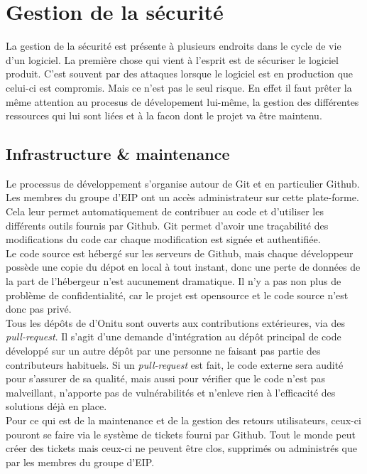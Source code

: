 \section{Gestion de la sécurité}

La gestion de la sécurité est présente à plusieurs endroits dans le cycle de vie d'un logiciel. La première chose qui vient à l'esprit est de sécuriser le logiciel produit. C'est souvent par des attaques lorsque le logiciel est en production que celui-ci est compromis. Mais ce n'est pas le seul risque. En effet il faut prêter la même attention au procesus de dévelopement lui-même, la gestion des différentes ressources qui lui sont liées et à la facon dont le projet va être maintenu.

\subsection{Infrastructure \& maintenance}

Le processus de développement s'organise autour de Git et en particulier Github. Les membres du groupe d'EIP ont un accès administrateur sur cette plate-forme. Cela leur permet automatiquement de contribuer au code et d'utiliser les différents outils fournis par Github. Git permet d'avoir une traçabilité des modifications du code car chaque modification est signée et authentifiée.\\

Le code source est hébergé sur les serveurs de Github, mais chaque développeur possède une copie du dépot en local à tout instant, donc une perte de données de la part de l'hébergeur n'est aucunement dramatique. Il n'y a pas non plus de problème de confidentialité, car le projet est opensource et le code source n'est donc pas privé.\\

Tous les dépôts de d'Onitu sont ouverts aux contributions extérieures, via des \textit{pull-request}. Il s'agit d'une demande d'intégration au dépôt principal de code développé sur un autre dépôt par une personne ne faisant pas partie des contributeurs habituels. Si un \textit{pull-request} est fait, le code externe sera audité pour s'assurer de sa qualité, mais aussi pour vérifier que le code n'est pas malveillant, n'apporte pas de vulnérabilités et n'enleve rien à l'efficacité des solutions déjà en place.\\

Pour ce qui est de la maintenance et de la gestion des retours utilisateurs, ceux-ci pouront se faire via le système de tickets fourni par Github. Tout le monde peut créer des tickets mais ceux-ci ne peuvent être clos, supprimés ou administrés que par les membres du groupe d'EIP.


